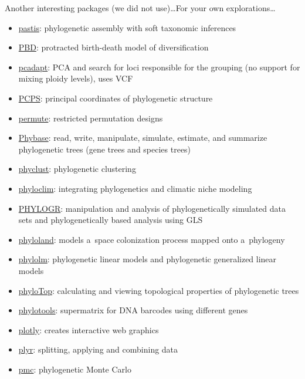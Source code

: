 \documentclass[compress, ucs, xelatex, 11pt, xcolor=svgnames, aspectratio=169,
	hyperref={
		bookmarks=true,
		unicode=true,
		colorlinks=true,
		pdftitle={Molecular data in R},
		plainpages=false,
		pdfauthor={Vojtech Zeisek},
		pdfsubject={Course about phylogeny and evolution in R},
		pdfcreator={XeLaTeX},
		pdfkeywords={R, evolution, phylogeny, molecular data},
		linkcolor=Crimson, %
		anchorcolor=Magenta, %
		citecolor=Magenta, %
		filecolor=Magenta, %
		menucolor=Magenta, %
		urlcolor=DodgerBlue, %
		pdftex},
	url={hyphens, lowtilde} %
	]{beamer}
\begin{document}
\begin{frame}[allowframebreaks]{Another interesting packages (we did not use)\ldots}{For your own explorations\ldots}
\begin{itemize}
		\item \href{https://CRAN.R-project.org/package=pastis}{pastis}: phylogenetic assembly with soft taxonomic inferences
		\item \href{https://CRAN.R-project.org/package=PBD}{PBD}: protracted birth-death model of diversification
		\item \href{https://CRAN.R-project.org/package=pcadapt}{pcadapt}: PCA and search for loci responsible for the grouping (no support for mixing ploidy levels), uses VCF
		\item \href{https://CRAN.R-project.org/package=PCPS}{PCPS}: principal coordinates of phylogenetic structure
		\item \href{https://CRAN.R-project.org/package=permute}{permute}: restricted permutation designs
		\item \href{https://github.com/lliu1871/phybase}{Phybase}: read, write, manipulate, simulate, estimate, and summarize phylogenetic trees (gene trees and species trees)
		\item \href{https://CRAN.R-project.org/package=phyclust}{phyclust}: phylogenetic clustering
		\item \href{https://CRAN.R-project.org/package=phyloclim}{phyloclim}: integrating phylogenetics and climatic niche modeling
		\item \href{https://CRAN.R-project.org/package=PHYLOGR}{PHYLOGR}: manipulation and analysis of phylogenetically simulated data sets and phylogenetically based analysis using GLS
		\item \href{https://CRAN.R-project.org/package=phyloland}{phyloland}: models a~space colonization process mapped onto a~phylogeny
		\item \href{https://CRAN.R-project.org/package=phylolm}{phylolm}: phylogenetic linear models and phylogenetic generalized linear models
		\item \href{https://CRAN.R-project.org/package=phyloTop}{phyloTop}: calculating and viewing topological properties of phylogenetic trees
		\item \href{https://CRAN.R-project.org/package=phylotools}{phylotools}: supermatrix for DNA barcodes using different genes
		\item \href{https://CRAN.R-project.org/package=plotly}{plotly}: creates interactive web graphics
		\item \href{https://CRAN.R-project.org/package=plyr}{plyr}: splitting, applying and combining data
		\item \href{https://CRAN.R-project.org/package=pmc}{pmc}: phylogenetic Monte Carlo

\end{itemize}
\end{frame}
\end{document}
